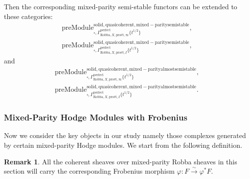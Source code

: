 \documentclass[12pt]{book}
\theoremstyle{definition}
\newtheorem{remark}{Remark}
\begin{document}
\indent Then the corresponding mixed-parity semi-stable functors can be extended to these categories:
\begin{align}
\mathrm{preModule}^\mathrm{solid,quasicoherent,mixed-paritysemistable}_{\square,\Gamma^\mathrm{perfect}_{\text{Robba},X,\text{pro\'et},\infty}\{t^{1/2}\}},\\
\mathrm{preModule}^\mathrm{solid,quasicoherent,mixed-paritysemistable}_{\square,\Gamma^\mathrm{perfect}_{\text{Robba},X,\text{pro\'et},I}\{t^{1/2}\}}, 
\end{align}
and
\begin{align}
\mathrm{preModule}^\mathrm{solid,quasicoherent,mixed-parityalmostsemistable}_{\square,\Gamma^\mathrm{perfect}_{\text{Robba},X,\text{pro\'et},\infty}\{t^{1/2}\}},\\
\mathrm{preModule}^\mathrm{solid,quasicoherent,mixed-parityalmostsemistable}_{\square,\Gamma^\mathrm{perfect}_{\text{Robba},X,\text{pro\'et},I}\{t^{1/2}\}}. 
\end{align}



\subsubsection{Mixed-Parity Hodge Modules with Frobenius}


\noindent Now we consider the key objects in our study namely those complexes generated by certain mixed-parity Hodge modules. We start from the following definition.

\begin{remark}
All the coherent sheaves over mixed-parity Robba sheaves in this section will carry the corresponding Frobenius morphism $\varphi: F \overset{\sim}{\longrightarrow} \varphi^*F$.
\end{remark}
\end{document}
